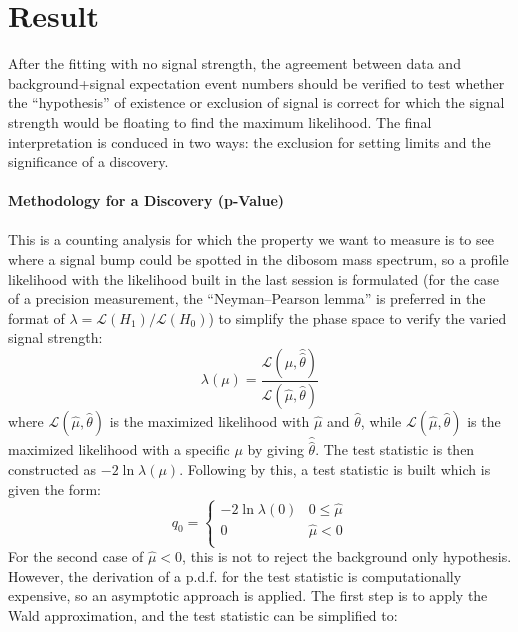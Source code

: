 \section{Result}
\label{Sec:lvqq_result}
After the fitting with no signal strength, the agreement between data and background+signal expectation event numbers should be verified to test whether the ``hypothesis'' of existence or exclusion of signal is correct for which the signal strength would be floating to find the maximum likelihood. The final interpretation is conduced in two ways: the exclusion for setting limits and the significance of a discovery. 
\\
\\{\bf Methodology for a Discovery (p-Value)}
\\
\\This is a counting analysis for which the property we want to measure is to see where a signal bump could be spotted in the dibosom mass spectrum, so a profile likelihood with the likelihood built in the last session is formulated\cite{profile1,profile2} (for the case of a precision measurement, the ``Neyman–Pearson lemma'' is preferred in the format of $\lambda=\mathcal{L}(H_{1})/\mathcal{L}(H_0)$\cite{pn}) to simplify the phase space to verify the varied signal strength:
\begin{equation}
\lambda(\mu) = \frac{\mathcal{L}(\mu,\hat{\hat{\theta}})}{\mathcal{L}(\hat{\mu},\hat{\theta})}
\end{equation}
where $\mathcal{L}(\hat{\mu},\hat{\theta})$ is the maximized likelihood with $\hat{\mu}$ and $\hat{\theta}$, while $\mathcal{L}(\hat{\mu},\hat{\theta})$ is the maximized likelihood with a specific $\mu$ by giving $\hat{\hat{\theta}}$. The test statistic is then constructed as $-2\ln{\lambda(\mu)}$. Following by this, a test statistic\cite{teststats} is built which is given the form:
\begin{equation}
\label{Eq:testPvalue}
q_{0} = 
\begin{cases}
-2 \ln \lambda(0) & 0 \le \hat{\mu} \\
0 & \hat{\mu} < 0 \\
\end{cases}
\end{equation}
\noindent
For the second case of $\hat{\mu}<0$, this is not to reject the background only hypothesis. However, the derivation of a p.d.f. for the test statistic is computationally expensive, so an asymptotic approach is applied. The first step is to apply the Wald approximation, and the test statistic can be simplified to:
